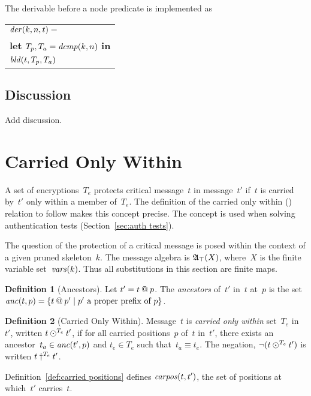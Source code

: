 \documentclass[12pt]{article}
\theoremstyle{definition}
\newtheorem{defn}{Definition}[section]
\newenvironment{note}{\itshape\par\noindent}{}
\begin{document}
The derivable before a node predicate is implemented as
\begin{center}
\begin{tabular}{l}
$\operatorname{\mathit{der}}(k,n,t)={}$\\
\quad\textbf{let} $T_p, T_a=\operatorname{\mathit{dcmp}}(k,n)$ \textbf{in}\\
\quad$\operatorname{\mathit{bld}}(t,T_p,T_a)$
\end{tabular}
\end{center}

\subsection*{Discussion}

\begin{note}
Add discussion.
\end{note}

\section{Carried Only Within}\label{sec:cow}

A set of encryptions~$T_e$ protects critical message~$t$ in
message~$t'$ if~$t$ is carried by~$t'$ only within a member of~$T_e$.
The definition of the carried only within ({\cow}) relation to follow makes
this concept precise.  The concept is used when solving authentication
tests (Section~\ref{sec:auth tests}).

The question of the protection of a critical message is posed within
the context of a given pruned skeleton~$k$.  The message algebra is
$\mathfrak A_\top(X)$, where~$X$ is the finite variable
set~$\operatorname{\mathit{vars}}(k)$.  Thus all substitutions in this section are finite
maps.

\begin{defn}[Ancestors]
Let $t'=t\mathbin{@} p$.  The \emph{ancestors} of~$t'$ in~$t$ at~$p$ is
the set $\operatorname{\mathit{anc}}(t,p)=\{t\mathbin{@} p'\mid \mbox{$p'$ a proper prefix
  of~$p$}\}$.
\end{defn}

\begin{defn}[Carried Only Within]\label{def:cow}
Message~$t$ is \emph{carried only within} set~$T_e$ in~$t'$, written
$t\mathbin{\odot^{T_e}}t'$, if for all carried positions~$p$ of~$t$ in~$t'$,
there exists an ancestor~$t_a\in\operatorname{\mathit{anc}}(t',p)$ and $t_e\in T_e$ such
that~$t_a\equiv t_e$.  The negation, $\neg(t\mathbin{\odot^{T_e}}t')$ is written
$t\mathbin{\dagger^{T_e}}t'$.
\end{defn}

Definition~\ref{def:carried positions} defines $\operatorname{\mathit{carpos}}(t,t')$, the
set of positions at which~$t'$ carries~$t$.
\end{document}
